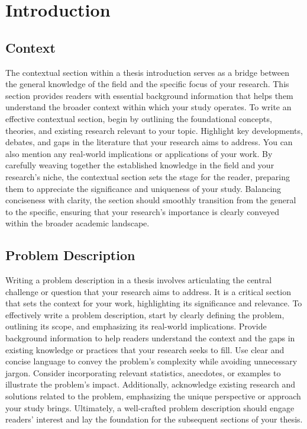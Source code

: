 \chapter{Introduction}\label{ch:intro}

\section{Context}\label{sec:intro-context}

The contextual section within a thesis introduction serves as a bridge between the general knowledge of the field and the specific focus of your research. This section provides readers with essential background information that helps them understand the broader context within which your study operates. To write an effective contextual section, begin by outlining the foundational concepts, theories, and existing research relevant to your topic. Highlight key developments, debates, and gaps in the literature that your research aims to address. You can also mention any real-world implications or applications of your work. By carefully weaving together the established knowledge in the field and your research's niche, the contextual section sets the stage for the reader, preparing them to appreciate the significance and uniqueness of your study. Balancing conciseness with clarity, the section should smoothly transition from the general to the specific, ensuring that your research's importance is clearly conveyed within the broader academic landscape.

\section{Problem Description}\label{sec:intro-problem-description}
Writing a problem description in a thesis involves articulating the central challenge or question that your research aims to address. It is a critical section that sets the context for your work, highlighting its significance and relevance. To effectively write a problem description, start by clearly defining the problem, outlining its scope, and emphasizing its real-world implications. Provide background information to help readers understand the context and the gaps in existing knowledge or practices that your research seeks to fill. Use clear and concise language to convey the problem's complexity while avoiding unnecessary jargon. Consider incorporating relevant statistics, anecdotes, or examples to illustrate the problem's impact. Additionally, acknowledge existing research and solutions related to the problem, emphasizing the unique perspective or approach your study brings. Ultimately, a well-crafted problem description should engage readers' interest and lay the foundation for the subsequent sections of your thesis. \medskip

